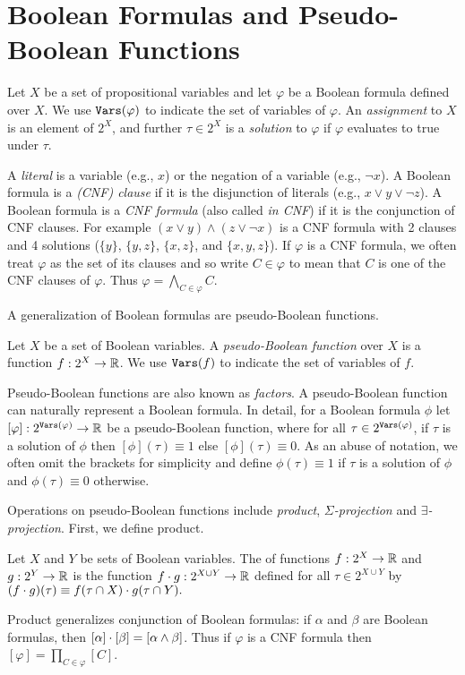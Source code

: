 \section{Boolean Formulas and Pseudo-Boolean Functions}
Let $X$ be a set of propositional variables and let $\varphi$ be a Boolean formula defined over $X$.
We use $\texttt{\upshape Vars}(\varphi)$ to indicate the set of variables of $\varphi$. An \emph{assignment} to $X$ is an element of $2^X$, and further $\tau \in 2^X$ is a \emph{solution} to $\varphi$ if $\varphi$ evaluates to true under $\tau$.

A \emph{literal} is a variable (e.g., $x$) or the negation of a variable (e.g., $\neg x$).
A Boolean formula is a \emph{(CNF) clause} if it is the disjunction of literals (e.g., $x \lor y \lor \neg z$).
A Boolean formula is a \emph{CNF formula} (also called \emph{in CNF}) if it is the conjunction of CNF clauses.
For example $(x \lor y) \land (z \lor \neg x)$ is a CNF formula with 2 clauses and 4 solutions ($\{y\}$, $\{y, z\}$, $\{x, z\}$, and $\{x, y, z\}$).
If $\varphi$ is a CNF formula, we often treat $\varphi$ as the set of its clauses and so write $C \in \varphi$ to mean that $C$ is one of the CNF clauses of $\varphi$. Thus $\varphi = \bigwedge_{C \in \varphi} C$.

A generalization of Boolean formulas are pseudo-Boolean functions.
\begin{definition}
\label{def_pseudoboolean}
Let $X$ be a set of Boolean variables.
A \emph{pseudo-Boolean function} over $X$ is a function $f: 2^X \to \mathbb{R}$.
We use $\texttt{\upshape Vars}(f)$ to indicate the set of variables of $f$.
\end{definition}
Pseudo-Boolean functions are also known as \emph{factors}.
A pseudo-Boolean function can naturally represent a Boolean formula. In detail, for a Boolean formula $\phi$ let $[\varphi]: 2^{\texttt{\upshape Vars}(\varphi)} \rightarrow \mathbb{R}$ be a pseudo-Boolean function, where for all $\tau \in 2^{\texttt{\upshape Vars}(\varphi)}$, if $\tau$ is a solution of $\phi$ then $[\phi](\tau) \equiv 1$ else $[\phi](\tau) \equiv 0$.
As an abuse of notation, we often omit the brackets for simplicity and define $\phi(\tau) \equiv 1$ if $\tau$ is a solution of $\phi$ and $\phi(\tau) \equiv 0$ otherwise.

Operations on pseudo-Boolean functions include \emph{product}, \emph{$\Sigma$-projection} and \emph{$\exists$-projection}.
First, we define product.
\begin{definition}[Product]
\label{def_mult}
    Let $X$ and $Y$ be sets of Boolean variables.
    The  of functions $f: 2^X \to \mathbb{R}$ and $g: 2^Y \to \mathbb{R}$ is the function $f \cdot g: 2^{X \cup Y} \to \mathbb{R}$ defined for all $\tau \in 2^{X \cup Y}$ by
    $(f \cdot g)(\tau) \equiv f(\tau \cap X) \cdot g(\tau \cap Y).$
\end{definition}
Product generalizes conjunction of Boolean formulas: if $\alpha$ and $\beta$ are Boolean formulas, then $[\alpha] \cdot [\beta] = [\alpha \land \beta]$. Thus if $\varphi$ is a CNF formula then $[\varphi] = \prod_{C \in \varphi} [C]$.

